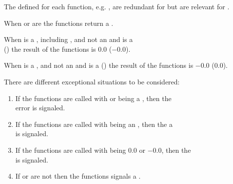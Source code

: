\documentclass[../Type-Manipulation-Coercion.tex]{subfiles}
\begin{document}
\noindent
The  defined for each function, e.g. , are
redundant for  but are relevant for .

\noindent
When  or  are
 the functions return a .

\noindent
When  is a , including ,
and not an  and  is a
\\
() the result of the
functions is $0.0$ ($-0.0$).

\noindent
When  is a ,
and not an  and  is a
 () the result of the
functions is $-0.0$ ($0.0$).

\DExceptional{}

There are different exceptional situations to be considered:
\begin{enumerate}
\item If the functions are called with
   or  being a
  , then the\\
   error is signaled.
\item If the functions are called with  being an
  , then the a\\
    is signaled.
\item If the functions are called with  being $0.0$ or $-0.0$, then
  the \\
    is signaled.
\item If  or  are not \CL{}
   then the functions signals a .
\end{enumerate}
\end{document}
